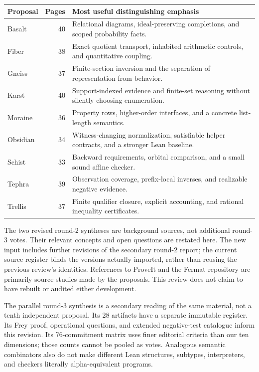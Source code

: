 \documentclass[11pt,letterpaper]{article}
\theoremstyle{definition}\newtheorem{definition}[proposition]{Definition}
\theoremstyle{remark}\newtheorem{remark}[proposition]{Remark}
\begin{document}
\begin{center}\small
\begin{tabularx}{\textwidth}{@{}l r Y@{}}
\toprule Proposal & Pages & Most useful distinguishing emphasis\\\midrule
Basalt & 40 & Relational diagrams, ideal-preserving completions, and scoped probability facts.\\
Fiber & 38 & Exact quotient transport, inhabited arithmetic controls, and quantitative coupling.\\
Gneiss & 37 & Finite-section inversion and the separation of representation from behavior.\\
Karst & 40 & Support-indexed evidence and finite-set reasoning without silently choosing enumeration.\\
Moraine & 36 & Property rows, higher-order interfaces, and a concrete list-length semantics.\\
Obsidian & 34 & Witness-changing normalization, satisfiable helper contracts, and a stronger Lean baseline.\\
Schist & 33 & Backward requirements, orbital comparison, and a small sound affine checker.\\
Tephra & 39 & Observation coverage, prefix-local inverses, and realizable negative evidence.\\
Trellis & 37 & Finite qualifier closure, explicit accounting, and rational inequality certificates.\\
\bottomrule
\end{tabularx}
\end{center}

The two revised round-2 syntheses are background sources, not additional
round-3 votes. Their relevant concepts and open questions are restated here.
The new input includes further revisions of the secondary round-2 report;
the current source register binds the versions actually imported, rather than
reusing the previous review's identities. References to ProveIt and the Fermat
repository are primarily source studies made by the proposals. This review
does not claim to have rebuilt or audited either development.

The parallel round-3 synthesis is a secondary reading of the same material,
not a tenth independent proposal. Its 28 artifacts have a separate immutable
register. Its Frey proof, operational questions, and extended negative-test
catalogue inform this revision. Its 76-commitment matrix uses finer editorial
criteria than our ten dimensions; those counts cannot be pooled as votes.
Analogous semantic combinators also do not make different Lean structures,
subtypes, interpreters, and checkers literally alpha-equivalent programs.
\end{document}
